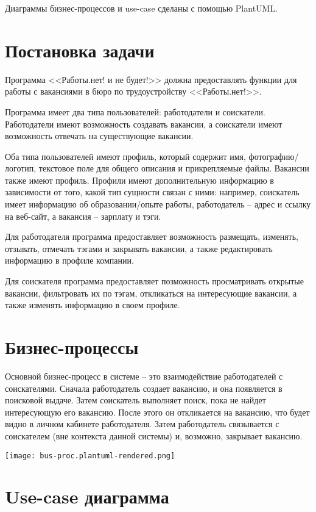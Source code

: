 \documentclass[a4page]{article}
\begin{document}
Диаграммы бизнес-процессов и use-case сделаны с помощью PlantUML.

\newpage
\section{Постановка задачи}

Программа <<Работы.нет! и не будет!>> должна предоставлять функции для работы с вакансиями в бюро по трудоустройству <<Работы.нет!>>.

Программа имеет два типа пользователей: работодатели и соискатели. Работодатели имеют возможность создавать вакансии,
а соискатели имеют возможность отвечать на существующие вакансии.

Оба типа пользователей имеют профиль, который содержит имя, фотографию/логотип, текстовое поле для общего описания и прикрепляемые файлы.
Вакансии также имеют профиль. Профили имеют дополнительную информацию в зависимости от того, какой тип сущности связан с ними:
например, соискатель имеет информацию об образовании/опыте работы, работодатель -- адрес и ссылку на веб-сайт,
а вакансия -- зарплату и тэги.

Для работодателя программа предоставляет возможность размещать, изменять, отзывать, отмечать тэгами и закрывать вакансии, а также редактировать информацию в профиле компании.

Для соискателя программа предоставляет позможность просматривать открытые вакансии, фильтровать их по тэгам, откликаться на интересующие вакансии, а также изменять информацию в своем профиле.

\newpage
\section{Бизнес-процессы}

Основной бизнес-процесс в системе -- это взаимодействие работодателей с соискателями.
Сначала работодатель создает вакансию, и она появляется в поисковой выдаче.
Затем соискатель выполняет поиск, пока не найдет интересующую его вакансию.
После этого он откликается на вакансию,
что будет видно в личном кабинете работодателя.
Затем работодатель связывается с соискателем (вне контекста данной системы)
и, возможно, закрывает вакансию.

\texttt{[image: bus-proc.plantuml-rendered.png]}

\newpage
\section{Use-case диаграмма}
\end{document}
